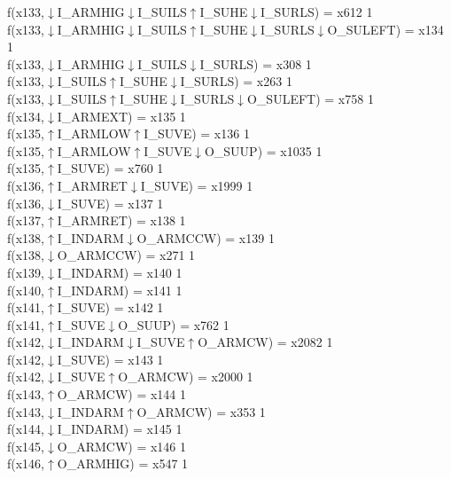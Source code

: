 f(x133,$\downarrow$I\_ARMHIG$\downarrow$I\_SUILS$\uparrow$I\_SUHE$\downarrow$I\_SURLS) = x612 {1} \\
f(x133,$\downarrow$I\_ARMHIG$\downarrow$I\_SUILS$\uparrow$I\_SUHE$\downarrow$I\_SURLS$\downarrow$O\_SULEFT) = x134 {1} \\
f(x133,$\downarrow$I\_ARMHIG$\downarrow$I\_SUILS$\downarrow$I\_SURLS) = x308 {1} \\
f(x133,$\downarrow$I\_SUILS$\uparrow$I\_SUHE$\downarrow$I\_SURLS) = x263 {1} \\
f(x133,$\downarrow$I\_SUILS$\uparrow$I\_SUHE$\downarrow$I\_SURLS$\downarrow$O\_SULEFT) = x758 {1} \\
f(x134,$\downarrow$I\_ARMEXT) = x135 {1} \\
f(x135,$\uparrow$I\_ARMLOW$\uparrow$I\_SUVE) = x136 {1} \\
f(x135,$\uparrow$I\_ARMLOW$\uparrow$I\_SUVE$\downarrow$O\_SUUP) = x1035 {1} \\
f(x135,$\uparrow$I\_SUVE) = x760 {1} \\
f(x136,$\uparrow$I\_ARMRET$\downarrow$I\_SUVE) = x1999 {1} \\
f(x136,$\downarrow$I\_SUVE) = x137 {1} \\
f(x137,$\uparrow$I\_ARMRET) = x138 {1} \\
f(x138,$\uparrow$I\_INDARM$\downarrow$O\_ARMCCW) = x139 {1} \\
f(x138,$\downarrow$O\_ARMCCW) = x271 {1} \\
f(x139,$\downarrow$I\_INDARM) = x140 {1} \\
f(x140,$\uparrow$I\_INDARM) = x141 {1} \\
f(x141,$\uparrow$I\_SUVE) = x142 {1} \\
f(x141,$\uparrow$I\_SUVE$\downarrow$O\_SUUP) = x762 {1} \\
f(x142,$\downarrow$I\_INDARM$\downarrow$I\_SUVE$\uparrow$O\_ARMCW) = x2082 {1} \\
f(x142,$\downarrow$I\_SUVE) = x143 {1} \\
f(x142,$\downarrow$I\_SUVE$\uparrow$O\_ARMCW) = x2000 {1} \\
f(x143,$\uparrow$O\_ARMCW) = x144 {1} \\
f(x143,$\downarrow$I\_INDARM$\uparrow$O\_ARMCW) = x353 {1} \\
f(x144,$\downarrow$I\_INDARM) = x145 {1} \\
f(x145,$\downarrow$O\_ARMCW) = x146 {1} \\
f(x146,$\uparrow$O\_ARMHIG) = x547 {1} \\
